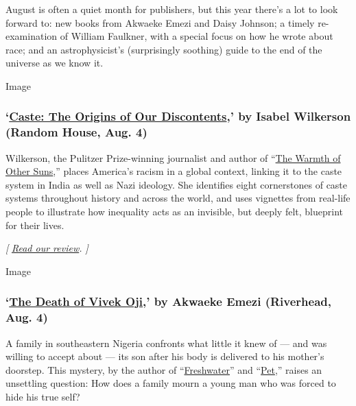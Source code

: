 August is often a quiet month for publishers, but this year there's a
lot to look forward to: new books from Akwaeke Emezi and Daisy Johnson;
a timely re-examination of William Faulkner, with a special focus on how
he wrote about race; and an astrophysicist's (surprisingly soothing)
guide to the end of the universe as we know it.

Image

\hypertarget{caste-the-origins-of-our-discontents-by-isabel-wilkerson-random-house-aug-4}{%
\subsubsection{\texorpdfstring{`\href{https://www.penguinrandomhouse.com/books/653196/caste-by-isabel-wilkerson/}{Caste:
The Origins of Our Discontents},' by Isabel Wilkerson (Random House,
Aug.
4)}{`Caste: The Origins of Our Discontents,' by Isabel Wilkerson (Random House, Aug. 4)}}\label{caste-the-origins-of-our-discontents-by-isabel-wilkerson-random-house-aug-4}}

Wilkerson, the Pulitzer Prize-winning journalist and author of
``\href{https://www.nytimes3xbfgragh.onion/2010/09/05/books/review/Oshinsky-t.html}{The
Warmth of Other Suns},'' places America's racism in a global context,
linking it to the caste system in India as well as Nazi ideology. She
identifies eight cornerstones of caste systems throughout history and
across the world, and uses vignettes from real-life people to illustrate
how inequality acts as an invisible, but deeply felt, blueprint for
their lives.

\emph{{[}}
\href{https://www.nytimes3xbfgragh.onion/2020/07/31/books/review-caste-isabel-wilkerson-origins-of-our-discontents.html}{\emph{Read
our review}}\emph{. {]}}

Image

\hypertarget{the-death-of-vivek-oji-by-akwaeke-emezi-riverhead-aug-4}{%
\subsubsection{\texorpdfstring{`\href{https://www.penguinrandomhouse.com/books/604152/the-death-of-vivek-oji-by-akwaeke-emezi/}{The
Death of Vivek Oji},' by Akwaeke Emezi (Riverhead, Aug.
4)}{`The Death of Vivek Oji,' by Akwaeke Emezi (Riverhead, Aug. 4)}}\label{the-death-of-vivek-oji-by-akwaeke-emezi-riverhead-aug-4}}

A family in southeastern Nigeria confronts what little it knew of ---
and was willing to accept about --- its son after his body is delivered
to his mother's doorstep. This mystery, by the author of
``\href{https://www.nytimes3xbfgragh.onion/2018/02/26/books/review/freshwater-akwaeke-emezi.html}{Freshwater}''
and
``\href{https://www.nytimes3xbfgragh.onion/2019/09/30/books/review/pet-akwaeke-emezi.html}{Pet},''
raises an unsettling question: How does a family mourn a young man who
was forced to hide his true self?

